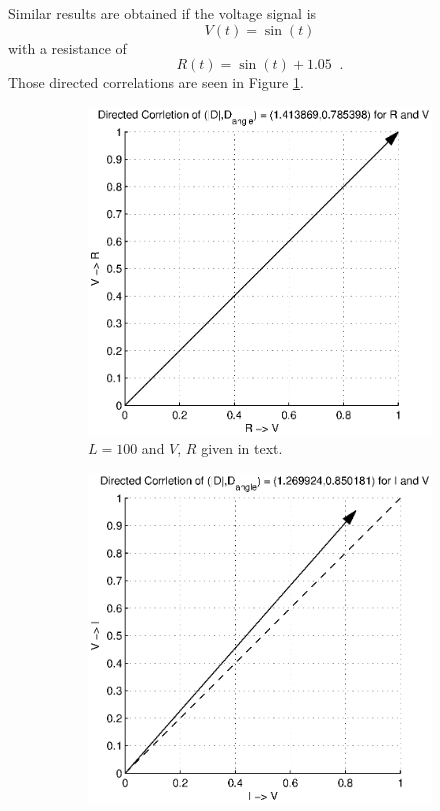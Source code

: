 \documentclass[a4paper,11pt]{article}
\begin{document}
Similar results are obtained if the voltage signal is 
$$
V(t) = \sin(t)
$$
with a resistance of
$$
R(t) = \sin(t) + 1.05\;\;.
$$
Those directed correlations are seen in Figure \ref{fig:RL_RvarySig2CCMVR}.
\begin{figure}[h!t]
\centering
\begin{subfigure}[b]{0.25\textwidth}
\label{fig:RL_RvarySig2CCMVR}
\includegraphics[scale=0.4]{graphics/RL_RvarySig2CCMVR.eps}
\caption{$L = 100$ and $V$, $R$ given in text.}
\end{subfigure}
\begin{subfigure}[b]{0.25\textwidth}
\label{fig:RL_RvarySig2CCMVI}
\includegraphics[scale=0.4]{graphics/RL_RvarySig2CCMVI.eps}

\end{subfigure}
\end{figure}
\end{document}
